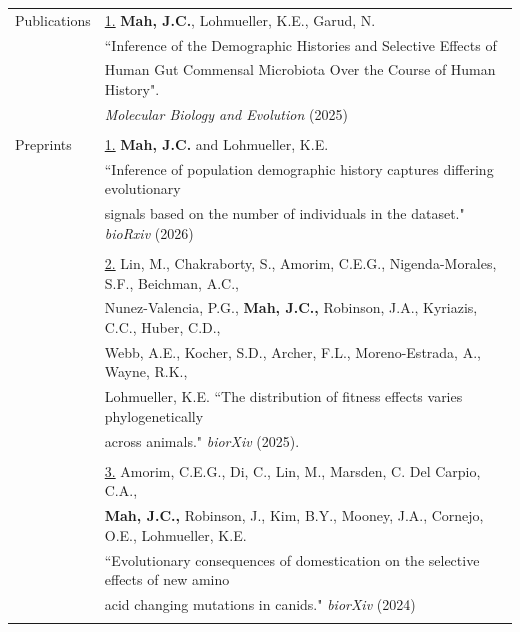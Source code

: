 \documentclass[letterpaper,11pt,oneside]{article}
\begin{document}
\noindent \begin{tabular}{@{} l l}

	\Large{Publications} & \underline{1.} \textbf{Mah, J.C.}, Lohmueller, K.E., Garud, N. \\
	& ``Inference of the Demographic Histories and Selective Effects of \\
	& Human Gut Commensal Microbiota Over the Course of Human History". \\
	& \textit{Molecular Biology and Evolution} (2025)\\
	

	\tabularnewline    
	\Large{Preprints}	& \underline{1.} \textbf{Mah, J.C.} and Lohmueller, K.E. \\
	& ``Inference of population demographic history captures differing evolutionary \\
	& signals based on the number of individuals in the dataset." \textit{bioRxiv} (2026) \\
	\tabularnewline    
	
	& \underline{2.} Lin, M., Chakraborty, S., Amorim, C.E.G., Nigenda-Morales, S.F., Beichman, A.C., \\
	& Nunez-Valencia, P.G., \textbf{Mah, J.C.,} Robinson, J.A., Kyriazis, C.C., Huber, C.D., \\
	& Webb, A.E., Kocher, S.D., Archer, F.L., Moreno-Estrada, A., Wayne, R.K., \\
	& Lohmueller, K.E. ``The distribution of fitness effects varies phylogenetically \\
	& across animals." \textit{biorXiv} (2025). \\
	\tabularnewline    
	
	& \underline{3.} Amorim, C.E.G., Di, C., Lin, M., Marsden, C. Del Carpio, C.A., \\
	& \textbf{Mah, J.C.,} Robinson, J., Kim, B.Y., Mooney, J.A., Cornejo, O.E., Lohmueller, K.E. \\ 
	& ``Evolutionary consequences of domestication on the selective effects of new amino  \\
	& acid changing mutations in canids." \textit{biorXiv} (2024) \\
	\tabularnewline    


\end{tabular}
\end{document}

